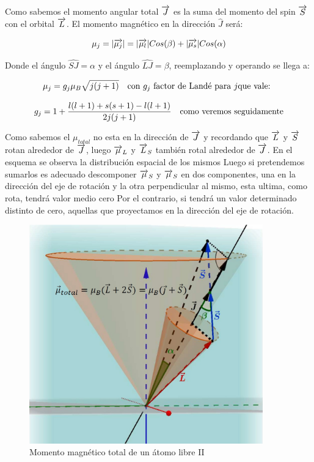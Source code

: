 Como sabemos el momento angular total $\overrightarrow{J}$ es la suma del momento del spin $\overrightarrow{S}$ con el orbital $\overrightarrow{L}$. El momento magnético en la dirección $\hat{J}$ será:

\begin{equation}
	\mu_{j}=\vert \overrightarrow{\mu_{j}} \vert=\vert \overrightarrow{\mu_{l}} \vert Cos(\beta)+\vert \overrightarrow{\mu_{s}} \vert Cos(\alpha)
\end{equation}

Donde el ángulo $\hat{SJ}= \alpha$ y el ángulo $\hat{LJ}=\beta$, reemplazando y operando se llega a:

\begin{equation*}
	\mu_{j}=g_{j}\mu_{B}\sqrt{j(j + 1)} \quad \text{con } g_{j} \text{ factor de Landé para } j \text{que vale: }
\end{equation*}

\begin{equation*}
	g_{j}= 1 +\dfrac{l(l + 1)+s(s + 1)-l(l + 1)}{2j(j + 1)} \quad \text{como veremos seguidamente}
\end{equation*}

Como sabemos el $\mu_{total}$ no esta en la dirección de $\overrightarrow{J}$ y recordando que $\overrightarrow{L}$ y $\overrightarrow{S}$ rotan alrededor de $\overrightarrow{J}$, luego $\overrightarrow{\mu}_{L}$ y $\overrightarrow{L}_{S}$  también rotal alrededor de $\overrightarrow{J}$. En el esquema se observa la distribución espacial de los mismos Luego si pretendemos sumarlos es adecuado descomponer $\overrightarrow{\mu}_{S}$ y $\overrightarrow{\mu}_{S}$ en dos componentes, una en la dirección del eje de rotación y la otra perpendicular al mismo, esta ultima, como rota, tendrá valor medio cero Por el contrario, si tendrá un valor determinado distinto de cero, aquellas que proyectamos en la dirección del eje de rotación.


\begin{figure}[H]
    \centering
    \includegraphics[width=0.9\textwidth]{./Figures/fig118}
	\caption{Momento magnético total de un átomo libre II}
	\label{fig:118}
 \end{figure}

